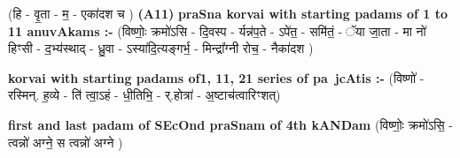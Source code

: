\documentclass[17pt]{extarticle}
\begin{document}
                  \newline
                      (हि - वृ॒ता - म॒ - एका॑दश च )  \textbf{(A11)} \newline \newline
\textbf{praSna korvai with starting padams of 1 to 11 anuvAkams :-} \newline
(विष्णोः॒ क्रमो॑ऽसि - दि॒वस्प - र्यन्न॑प॒ते - ऽपे॑त॒ - समि॑तं॒ - ॅया जा॒ता - मा नो॑ हिꣳसी - द॒भ्य॑स्थाद् - ध्रु॒वा - ऽस्या॑दि॒त्यङ्गर्भ॒ - मिन्द्रा᳚ग्नी रोच॒ - नैका॑दश ) \newline

\textbf{korvai with starting padams of1, 11, 21 series of pa~jcAtis :-} \newline
(विष्णो॑ - रस्मिन्. ह॒व्ये - ति॑ त्वा॒ऽहं - धी॒तिभि॒ - र्.होत्रा॑ - अ॒ष्टाच॑त्वारिꣳशत्) \newline

\textbf{first and last padam of SEcOnd praSnam of 4th kANDam} \newline
(विष्णोः॒ क्रमो॑ऽसि॒ - त्वन्नो॑ अग्ने॒ स त्वन्नो॑ अग्ने ) \newline 
\end{document}
